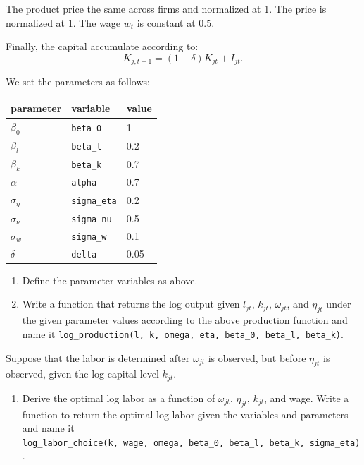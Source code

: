 \documentclass[
]{book}
\providecommand{\tightlist}{%
  \setlength{\itemsep}{0pt}\setlength{\parskip}{0pt}}
\begin{document}
The product price the same across firms and normalized at 1. The price is normalized at 1. The wage \(w_t\) is constant at 0.5.

Finally, the capital accumulate according to:
\[
K_{j, t + 1} = (1 - \delta) K_{jt} + I_{jt}.
\]

We set the parameters as follows:

\begin{longtable}[]{@{}lll@{}}
\toprule()
parameter & variable & value \\
\midrule()
\endhead
\(\beta_0\) & \texttt{beta\_0} & 1 \\
\(\beta_l\) & \texttt{beta\_l} & 0.2 \\
\(\beta_k\) & \texttt{beta\_k} & 0.7 \\
\(\alpha\) & \texttt{alpha} & 0.7 \\
\(\sigma_{\eta}\) & \texttt{sigma\_eta} & 0.2 \\
\(\sigma_{\nu}\) & \texttt{sigma\_nu} & 0.5 \\
\(\sigma_{w}\) & \texttt{sigma\_w} & 0.1 \\
\(\delta\) & \texttt{delta} & 0.05 \\
\bottomrule()
\end{longtable}

\begin{enumerate}
\def\labelenumi{\arabic{enumi}.}
\item
  Define the parameter variables as above.
\item
  Write a function that returns the log output given \(l_{jt}\), \(k_{jt}\), \(\omega_{jt}\), and \(\eta_{jt}\) under the given parameter values according to the above production function and name it \texttt{log\_production(l,\ k,\ omega,\ eta,\ beta\_0,\ beta\_l,\ beta\_k)}.
\end{enumerate}

Suppose that the labor is determined after \(\omega_{jt}\) is observed, but before \(\eta_{jt}\) is observed, given the log capital level \(k_{jt}\).

\begin{enumerate}
\def\labelenumi{\arabic{enumi}.}
\setcounter{enumi}{2}
\tightlist
\item
  Derive the optimal log labor as a function of \(\omega_{jt}\), \(\eta_{jt}\), \(k_{jt}\), and wage. Write a function to return the optimal log labor given the variables and parameters and name it \texttt{log\_labor\_choice(k,\ wage,\ omega,\ beta\_0,\ beta\_l,\ beta\_k,\ sigma\_eta)}.
\end{enumerate}
\end{document}
